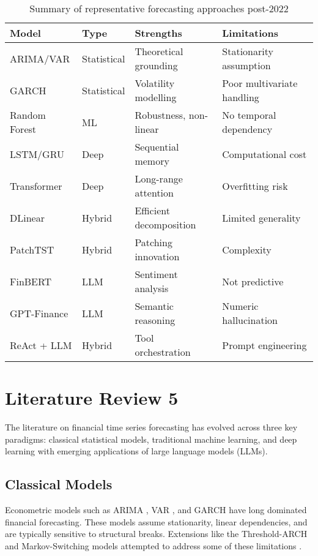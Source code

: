 \documentclass[conference]{IEEEtran}
\begin{document}
\begin{table}[h]
\centering
\begin{tabular}{|l|l|l|l|}
\hline
\textbf{Model} & \textbf{Type} & \textbf{Strengths} & \textbf{Limitations} \\
\hline
ARIMA/VAR & Statistical & Theoretical grounding & Stationarity assumption \\
GARCH & Statistical & Volatility modelling & Poor multivariate handling \\
Random Forest & ML & Robustness, non-linear & No temporal dependency \\
LSTM/GRU & Deep & Sequential memory & Computational cost \\
Transformer & Deep & Long-range attention & Overfitting risk \\
DLinear & Hybrid & Efficient decomposition & Limited generality \\
PatchTST & Hybrid & Patching innovation & Complexity \\
FinBERT & LLM & Sentiment analysis & Not predictive \\
GPT-Finance & LLM & Semantic reasoning & Numeric hallucination \\
ReAct + LLM & Hybrid & Tool orchestration & Prompt engineering \\
\hline
\end{tabular}
\caption{Summary of representative forecasting approaches post-2022}
\end{table}

\section{Literature Review 5}

The literature on financial time series forecasting has evolved across three key paradigms: classical statistical models, traditional machine learning, and deep learning with emerging applications of large language models (LLMs).

\subsection{Classical Models}
Econometric models such as ARIMA \cite{box1970time}, VAR \cite{sims1980macroeconomics}, and GARCH \cite{bollerslev1986garch} have long dominated financial forecasting. These models assume stationarity, linear dependencies, and are typically sensitive to structural breaks. Extensions like the Threshold-ARCH and Markov-Switching models attempted to address some of these limitations \cite{hamilton1989regime}.
\end{document}
